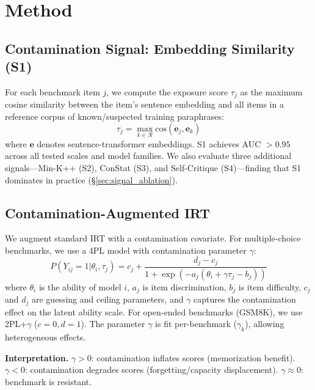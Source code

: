 \documentclass[11pt,a4paper]{article}
\begin{document}
\section{Method}

\subsection{Contamination Signal: Embedding Similarity (S1)}

For each benchmark item $j$, we compute the exposure score $\tau_j$ as the maximum cosine similarity between the item's sentence embedding and all items in a reference corpus of known/suspected training paraphrases:
\begin{equation}
\tau_j = \max_{k \in \mathcal{R}} \text{cos}(\mathbf{e}_j, \mathbf{e}_k)
\end{equation}
where $\mathbf{e}$ denotes sentence-transformer embeddings. S1 achieves AUC $> 0.95$ across all tested scales and model families. We also evaluate three additional signals---Min-K++ (S2), ConStat (S3), and Self-Critique (S4)---finding that S1 dominates in practice (\S\ref{sec:signal_ablation}).

\subsection{Contamination-Augmented IRT}

We augment standard IRT with a contamination covariate. For multiple-choice benchmarks, we use a 4PL model with contamination parameter $\gamma$:
\begin{equation}
P(Y_{ij}=1 | \theta_i, \tau_j) = c_j + \frac{d_j - c_j}{1 + \exp(-a_j(\theta_i + \gamma \tau_j - b_j))}
\end{equation}
where $\theta_i$ is the ability of model $i$, $a_j$ is item discrimination, $b_j$ is item difficulty, $c_j$ and $d_j$ are guessing and ceiling parameters, and $\gamma$ captures the contamination effect on the latent ability scale. For open-ended benchmarks (GSM8K), we use 2PL+$\gamma$ ($c=0, d=1$). The parameter $\gamma$ is fit per-benchmark ($\gamma_k$), allowing heterogeneous effects.

\textbf{Interpretation.} $\gamma > 0$: contamination inflates scores (memorization benefit). $\gamma < 0$: contamination degrades scores (forgetting/capacity displacement). $\gamma \approx 0$: benchmark is resistant.
\end{document}
